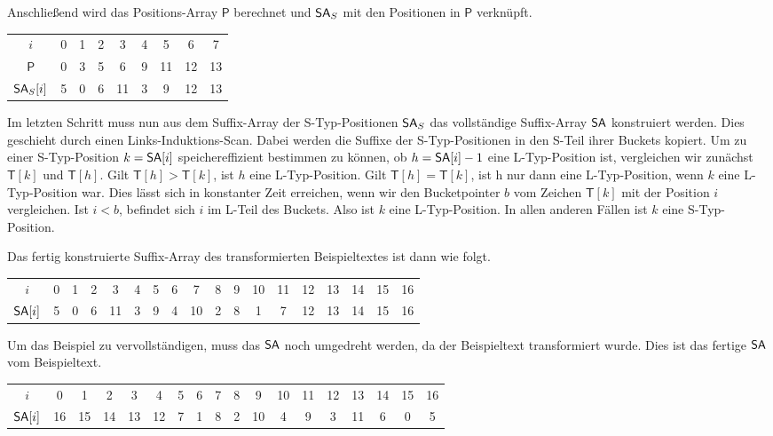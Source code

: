 Anschließend wird das Positions-Array $\mathsf{P}$ berechnet und $\sa_{S}$ mit den Positionen in $\mathsf{P}$ verknüpft. 

\begin{table}[H]
	\footnotesize
	\centering
	\begin{tabular}{c| c c c c c c c c }
		$i$ & 0 & 1 & 2 & 3 & 4 & 5 & 6 & 7\\
		$\mathsf{P}$ & 0 & 3 & 5 & 6 & 9 & 11 & 12 & 13\\
		$\sa_{S}[i]$ & 5 & 0 & 6 & 11 & 3 & 9 & 12 & 13 
	\end{tabular}
\end{table}

Im letzten Schritt muss nun aus dem Suffix-Array der S-Typ-Positionen $\sa_{S}$ das vollständige Suffix-Array $\sa$ konstruiert werden. Dies geschieht durch einen Links-Induktions-Scan. Dabei werden die Suffixe der S-Typ-Positionen in den S-Teil ihrer Buckets kopiert. Um zu einer S-Typ-Position $k=\sa[i]$ speichereffizient bestimmen zu können, ob $h=\sa[i]-1$ eine L-Typ-Position ist, vergleichen wir zunächst $\mathsf{T}[k]$ und $\mathsf{T}[h]$. Gilt $\mathsf{T}[h] > \mathsf{T}[k]$, ist $h$ eine L-Typ-Position. Gilt $\mathsf{T}[h] = \mathsf{T}[k]$, ist h nur dann eine L-Typ-Position, wenn $k$ eine L-Typ-Position war. Dies lässt sich in konstanter Zeit erreichen, wenn wir den Bucketpointer $b$ vom Zeichen $\mathsf{T}[k]$ mit der Position $i$ vergleichen. Ist $i < b$, befindet sich $i$ im L-Teil des Buckets. Also ist $k$ eine L-Typ-Position. In allen anderen Fällen ist $k$ eine S-Typ-Position. \par
Das fertig konstruierte Suffix-Array des transformierten Beispieltextes ist dann wie folgt. 

\begin{table}[H]
	\footnotesize
	\centering
	\begin{tabular}{c| c c c c c c c c c c c c c c c c c}
		$i$ & 0 & 1 & 2 & 3 & 4 & 5 & 6 & 7 & 8 & 9 & 10 & 11 & 12 & 13 & 14 & 15 & 16 \\
		$\sa[i]$ & 5 & 0 & 6 & 11 & 3 & 9 & 4 & 10 & 2 & 8 & 1 & 7 & 12 & 13 & 14 & 15 & 16 
	\end{tabular}
\end{table}

Um das Beispiel zu vervollständigen, muss das $\sa$ noch umgedreht werden, da der Beispieltext transformiert wurde. Dies ist das fertige $\sa$ vom Beispieltext.

\begin{table}[H]
	\footnotesize
	\centering
	\begin{tabular}{c| c c c c c c c c c c c c c c c c c}
		$i$ & 0 & 1 & 2 & 3 & 4 & 5 & 6 & 7 & 8 & 9 & 10 & 11 & 12 & 13 & 14 & 15 & 16 \\
		$\sa[i]$ & 16 & 15 & 14 & 13 & 12 & 7 & 1 & 8 & 2 & 10 & 4 & 9 & 3 & 11 & 6 & 0 & 5 
	\end{tabular}
\end{table}
